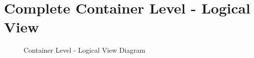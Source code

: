 \chapter{Complete Container Level - Logical View}
\label{AppendixB}

\begin{landscape}
    \begin{figure}[H]
       \centering
    \resizebox{0.8\columnwidth}{!}
    {
       
    }
    \caption[Container Level - Logical View Diagram]{Container Level - Logical View Diagram}
       \label{fig:AppendixB:complete}
    \end{figure}
 \end{landscape}
